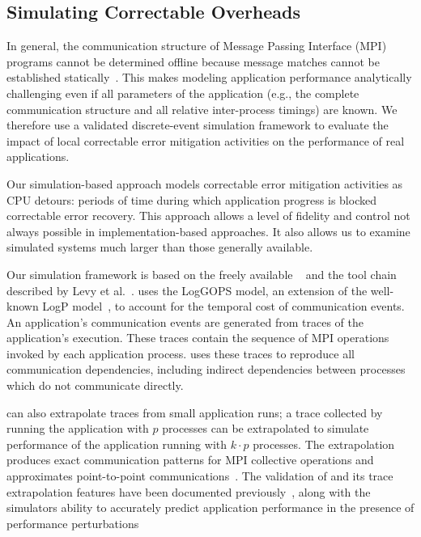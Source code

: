 \subsection{Simulating Correctable Overheads}

In general, the communication structure of Message Passing Interface (MPI)
programs cannot be determined offline because message matches cannot be
established statically~\cite{bronevetsky2009communication}.  This makes
modeling application performance analytically challenging even if all
parameters of the application (e.g., the complete communication structure and
all relative inter-process timings) are known.  We therefore use a validated
discrete-event simulation framework to evaluate the impact of local
correctable error mitigation activities on the performance of real applications.

Our simulation-based approach models correctable error mitigation activities as
CPU detours: periods of time during which application progress is blocked correctable
error recovery.  This approach allows a level of
fidelity and control not always possible in implementation-based approaches. It
also allows us to examine simulated systems much larger than those generally
available.

Our simulation framework is based on the freely available
\LogGOPSim~\cite{Hoefler:2010:LogGOPSim} and the tool chain described by Levy et
al.~\cite{Levy2013UsingSimulation}.  \LogGOPSim uses the LogGOPS model, an
extension of the well-known LogP model~\cite{Culler:1993:LogP}, to account for
the temporal cost of communication events.  An application's communication
events are generated from traces of the application's execution.  These traces
contain the sequence of MPI operations invoked by each application process.
\LogGOPSim uses these traces to reproduce all communication dependencies,
including indirect dependencies between processes which do not communicate
directly.

\LogGOPSim can also extrapolate traces from small application runs; a trace
collected by running the application with $p$ processes can be extrapolated to
simulate performance of the application running with $k\cdot p$ processes. The
extrapolation produces exact communication patterns for MPI collective
operations and approximates point-to-point
communications~\cite{Hoefler:2010:LogGOPSim}.  The validation of \LogGOPSim and
its trace extrapolation features have been documented
previously~\cite{Hoefler:2010:LogGOPSim}, along with the simulators ability to
accurately predict application performance in the presence of performance
perturbations~\cite{Ferreira:2014:Understanding,Levy2013UsingSimulation,Hoefler:2010:Characterizing}

